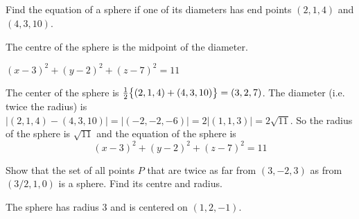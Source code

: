 
\subsection*{\Procedural}

\begin{question}
Find the equation of a sphere if one of its diameters has end
points $(2,1,4)$ and $(4,3,10)$.
\end{question}

\begin{hint}
The centre of the sphere is the midpoint of the diameter.
\end{hint}

\begin{answer}
$(x-3)^2+(y-2)^2+(z-7)^2=11$
\end{answer}

\begin{solution}
The center of the sphere is 
$\tfrac{1}{2}\big\{(2,1,4)+(4,3,10)\big\}=(3,2,7)$. The diameter (i.e. twice the radius) is $|(2,1,4)-(4,3,10)|=|(-2,-2,-6)|=2|(1,1,3)|=2\sqrt{11}$. So the radius of the sphere is $\sqrt{11}$ and
the equation of the sphere is
\begin{equation*}
(x-3)^2+(y-2)^2+(z-7)^2=11
\end{equation*}
\end{solution}

\begin{question}
Show that the set of all points $P$ that are twice as far from
$(3,-2,3)$ as from $(3/2,1,0)$ is a sphere. Find its centre and radius.
\end{question}


\begin{answer}
The sphere has radius 3 and is centered on $(1,2,-1)$.
\end{answer}

